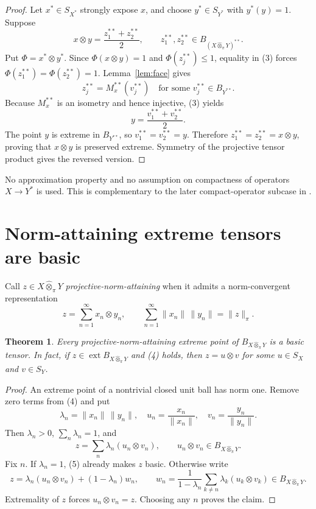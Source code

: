 \documentclass[11pt]{article}
\newtheorem{theorem}{Theorem}
\newcommand{\pt}{\widehat{\otimes}_{\pi}}
\begin{document}
\begin{proof}
Let $x^*\in S_{X^*}$ strongly expose $x$, and choose
$y^*\in S_{Y^*}$ with $y^*(y)=1$. Suppose
\[
 x\otimes y=\frac{z_1^{**}+z_2^{**}}2,
 \qquad z_1^{**},z_2^{**}\in B_{(X\pt Y)^{**}}.
 \tag{3}
\]
Put $\Phi=x^*\otimes y^*$. Since $\Phi(x\otimes y)=1$ and
$\Phi(z_j^{**})\le1$, equality in (3) forces
$\Phi(z_1^{**})=\Phi(z_2^{**})=1$. Lemma~\ref{lem:face} gives
\[
  z_j^{**}=M_x^{**}(v_j^{**})
  \quad\text{for some }v_j^{**}\in B_{Y^{**}}.
\]
Because $M_x^{**}$ is an isometry and hence injective, (3) yields
\[
  y=\frac{v_1^{**}+v_2^{**}}2.
\]
The point $y$ is extreme in $B_{Y^{**}}$, so
$v_1^{**}=v_2^{**}=y$. Therefore
$z_1^{**}=z_2^{**}=x\otimes y$, proving that $x\otimes y$ is preserved
extreme. Symmetry of the projective tensor product gives the reversed version.
\end{proof}

No approximation property and no assumption on compactness of operators
$X\to Y^*$ is used. This is complementary to the later compact-operator
subcase in \cite{APEP}.

\section{Norm-attaining extreme tensors are basic}

Call $z\in X\pt Y$ \emph{projective-norm-attaining} when it admits a
norm-convergent representation
\[
 z=\sum_{n=1}^{\infty}x_n\otimes y_n,
 \qquad
 \sum_{n=1}^{\infty}\|x_n\|\,\|y_n\|=\|z\|_\pi.
 \tag{4}
\]

\begin{theorem}\label{thm:attaining}
Every projective-norm-attaining extreme point of $B_{X\pt Y}$ is a basic
tensor. In fact, if $z\in\operatorname{ext}B_{X\pt Y}$ and (4) holds, then
$z=u\otimes v$ for some $u\in S_X$ and $v\in S_Y$.
\end{theorem}

\begin{proof}
An extreme point of a nontrivial closed unit ball has norm one. Remove zero
terms from (4) and put
\[
 \lambda_n=\|x_n\|\,\|y_n\|,
 \quad
 u_n=\frac{x_n}{\|x_n\|},
 \quad
 v_n=\frac{y_n}{\|y_n\|}.
\]
Then $\lambda_n>0$, $\sum_n\lambda_n=1$, and
\[
 z=\sum_n\lambda_n(u_n\otimes v_n),
 \qquad u_n\otimes v_n\in B_{X\pt Y}.
 \tag{5}
\]
Fix $n$. If $\lambda_n=1$, (5) already makes $z$ basic. Otherwise write
\[
 z=\lambda_n(u_n\otimes v_n)+(1-\lambda_n)w_n,
 \qquad
 w_n=\frac{1}{1-\lambda_n}
      \sum_{k\ne n}\lambda_k(u_k\otimes v_k)\in B_{X\pt Y}.
\]
Extremality of $z$ forces $u_n\otimes v_n=z$. Choosing any $n$ proves the
claim.
\end{proof}
\end{document}
